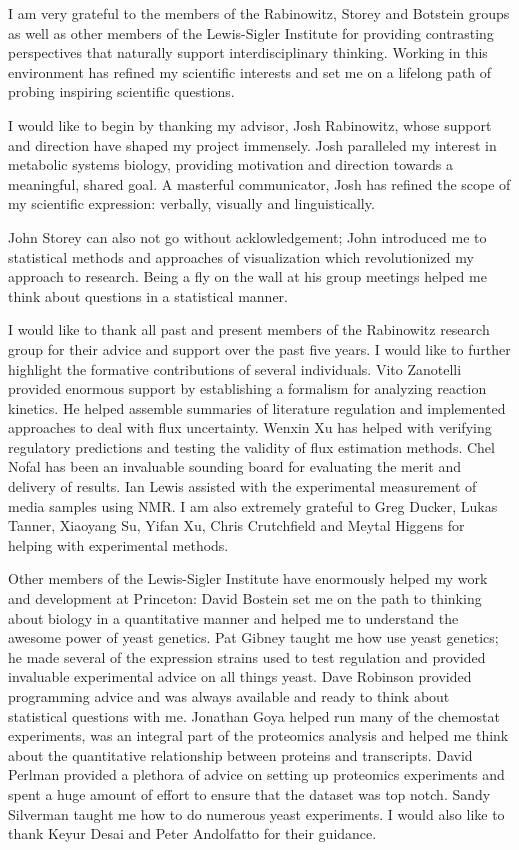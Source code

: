 I am very grateful to the members of the Rabinowitz, Storey and Botstein groups as well as other members of the Lewis-Sigler Institute for providing contrasting perspectives that naturally support interdisciplinary thinking. Working in this environment has refined my scientific interests and set me on a lifelong path of probing inspiring scientific questions.

I would like to begin by thanking my advisor, Josh Rabinowitz, whose support and direction have shaped my project immensely. Josh paralleled my interest in metabolic systems biology, providing motivation and direction towards a meaningful, shared goal. A masterful communicator, Josh has refined the scope of my scientific expression: verbally, visually and linguistically.

John Storey can also not go without acklowledgement; John introduced me to statistical methods and approaches of visualization which revolutionized my approach to research. Being a fly on the wall at his group meetings helped me think about questions in a statistical manner. 

I would like to thank all past and present members of the Rabinowitz research group for their advice and support over the past five years. I would like to further highlight the formative contributions of several individuals. Vito Zanotelli provided enormous support by establishing a formalism for analyzing reaction kinetics. He helped assemble summaries of literature regulation and implemented approaches to deal with flux uncertainty. Wenxin Xu has helped with verifying regulatory predictions and testing the validity of flux estimation methods. Chel Nofal has been an invaluable sounding board for evaluating the merit and delivery of results. Ian Lewis assisted with the experimental measurement of media samples using NMR. I am also extremely grateful to Greg Ducker, Lukas Tanner, Xiaoyang Su, Yifan Xu, Chris Crutchfield and Meytal Higgens for helping with experimental methods.

Other members of the Lewis-Sigler Institute have enormously helped my work and development at Princeton: David Bostein set me on the path to thinking about biology in a quantitative manner and helped me to understand the awesome power of yeast genetics. Pat Gibney taught me how use yeast genetics; he made several of the expression strains used to test regulation and provided invaluable experimental advice on all things yeast. Dave Robinson provided programming advice and was always available and ready to think about statistical questions with me. Jonathan Goya helped run many of the chemostat experiments, was an integral part of the proteomics analysis and helped me think about the quantitative relationship between proteins and transcripts. David Perlman provided a plethora of advice on setting up proteomics experiments and spent a huge amount of effort to ensure that the dataset was top notch. Sandy Silverman taught me how to do numerous yeast experiments. I would also like to thank Keyur Desai and Peter Andolfatto for their guidance.

